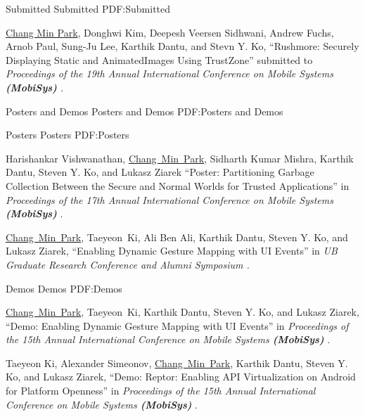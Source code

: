 \documentclass[letterpaper,MMMyyyy,nonstopmode]{simpleresumecv}
\begin{document}
\begin{Body}
\SubSection
{Submitted}
{Submitted}
{PDF:Submitted}

\begingroup
\renewcommand{\MaxNumberedItem}{[88]}

\Gap
\NumberedItem{[1]}
\underline{Chang Min Park}, Donghwi Kim, Deepesh Veersen Sidhwani, Andrew Fuchs, Arnob Paul,
Sung-Ju Lee, Karthik Dantu, and Stevn Y. Ko,
``Rushmore: Securely Displaying Static and AnimatedImages Using TrustZone'' submitted to
\textit{Proceedings of the 19th Annual International Conference on Mobile Systems \textbf{(MobiSys)}
.}



\Section
{Posters and Demos}
{Posters and Demos}
{PDF:Posters and Demos}

\SubSection
{Posters}
{Posters}
{PDF:Posters}

\begingroup
\renewcommand{\MaxNumberedItem}{[88]}

\BigGap
\NumberedItem{[1]}
Harishankar Vishwanathan, \underline{Chang~Min~Park}, Sidharth Kumar Mishra, Karthik Dantu, 
Steven Y. Ko, and Lukasz Ziarek
``Poster: Partitioning Garbage Collection Between the Secure and Normal Worlds for Trusted Applications'' in
\textit{Proceedings of the 17th Annual International Conference on Mobile Systems \textbf{(MobiSys)}
}.

\Gap
\NumberedItem{[2]}
\underline{Chang~Min~Park}, Taeyeon~Ki, Ali Ben Ali, Karthik Dantu, Steven Y. Ko, 
and Lukasz Ziarek, 
``Enabling Dynamic Gesture Mapping with UI Events'' in
\textit{UB Graduate Research Conference and Alumni Symposium
.}


\BigGap
\SubSection
{Demos}
{Demos}
{PDF:Demos}

\begingroup
\renewcommand{\MaxNumberedItem}{[88]}

\BigGap
\NumberedItem{[1]}
\underline{Chang~Min~Park}, Taeyeon~Ki, Karthik Dantu, Steven Y. Ko, and Lukasz Ziarek, 
``Demo: Enabling Dynamic Gesture Mapping with UI Events'' in
\textit{Proceedings of the 15th Annual International Conference on Mobile Systems \textbf{(MobiSys)}
}.

\Gap
\NumberedItem{[2]}
Taeyeon Ki, Alexander Simeonov, \underline{Chang~Min~Park}, Karthik Dantu, Steven Y. Ko, 
and Lukasz Ziarek, 
``Demo: Reptor: Enabling API Virtualization on Android for Platform Openness'' in
\textit{Proceedings of the 15th Annual International Conference on Mobile Systems \textbf{(MobiSys)}
}.


\end{Body}
\end{document}
